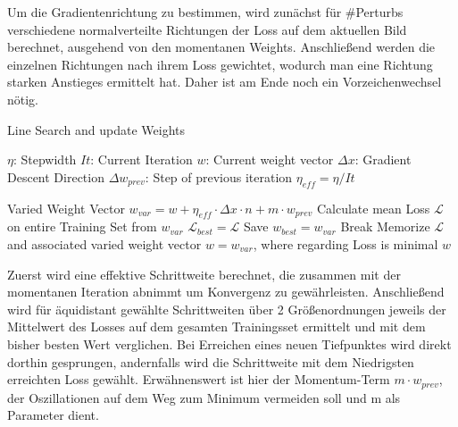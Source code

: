 Um die Gradientenrichtung zu bestimmen, wird zunächst für \#Perturbs verschiedene normalverteilte Richtungen der Loss auf dem aktuellen Bild berechnet, ausgehend von den momentanen Weights. Anschließend werden die einzelnen Richtungen nach ihrem Loss gewichtet, wodurch man eine Richtung starken Anstieges ermittelt hat. Daher ist am Ende noch ein Vorzeichenwechsel nötig.

\vspace{1cm}


\begin{algorithm}[H]
\caption{Line Search and update Weights}\label{alg:sgd_ls}
\begin{algorithmic}[1]
	\State $\eta$: Stepwidth
	\State $It$: Current Iteration
	\State $w$: Current weight vector
	\State $\Delta x$: Gradient Descent Direction
	\State $\Delta w_{prev}$: Step of previous iteration
	\State
	\State $\eta_{eff} = \eta / It$
	\State
			
		\State Varied Weight Vector $w_{var} = w + \eta_{eff} \cdot \Delta x \cdot n + m \cdot w_{prev} $
		\State Calculate mean Loss $\mathcal{L}$ on entire Training Set
		\State from $w_{var}$
			\State $\mathcal{L}_{best} = \mathcal{L}$
			\State Save $w_{best} = w_{var}$
			\State Break
		\EndIf
		\State Memorize $\mathcal{L}$ and associated varied weight vector
	\EndFor
	\State $w = w_{var}$, where regarding Loss is minimal
	\State \Return $w$
\EndProcedure
\end{algorithmic}
\end{algorithm}

\vspace{0.5cm}

Zuerst wird eine effektive Schrittweite berechnet, die zusammen mit der momentanen Iteration abnimmt um Konvergenz zu gewährleisten. Anschließend wird für äquidistant gewählte Schrittweiten über 2 Größenordnungen jeweils der Mittelwert des Losses auf dem gesamten Trainingsset ermittelt und mit dem bisher besten Wert verglichen. Bei Erreichen eines neuen Tiefpunktes wird direkt dorthin gesprungen, andernfalls wird die Schrittweite mit dem Niedrigsten erreichten Loss gewählt. Erwähnenswert ist hier der Momentum-Term $m \cdot w_{prev}$, der Oszillationen auf dem Weg zum Minimum vermeiden soll und m als Parameter dient.







